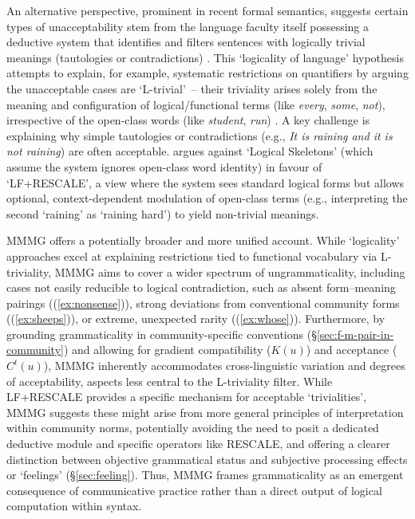 \documentclass[12pt,letterpaper]{article}
\begin{document}
An alternative perspective, prominent in recent formal semantics, suggests certain types of unacceptability stem from the language faculty itself possessing a deductive system that identifies and filters sentences with logically trivial meanings (tautologies or contradictions) \autocite[cf.][]{del_pinal_logicality_2019, chierchia_logic_2013, fox_economy_2000}. This `logicality of language' hypothesis attempts to explain, for example, systematic restrictions on quantifiers by arguing the unacceptable cases are `L-trivial'~-- their triviality arises solely from the meaning and configuration of logical/functional terms (like \textit{every}, \textit{some}, \textit{not}), irrespective of the open-class words (like \textit{student}, \textit{run}) \autocite{gajewski_l-triviality_2009}. A key challenge is explaining why simple tautologies or contradictions (e.g., \textit{It is raining and it is not raining}) are often acceptable. \textcite{del_pinal_logicality_2019} argues against `Logical Skeletons' (which assume the system ignores open-class word identity) in favour of `LF+RESCALE', a view where the system sees standard logical forms but allows optional, context-dependent modulation of open-class terms (e.g., interpreting the second `raining' as `raining hard') to yield non-trivial meanings.

MMMG offers a potentially broader and more unified account. While `logicality' approaches excel at explaining restrictions tied to functional vocabulary via L-triviality, MMMG aims to cover a wider spectrum of ungrammaticality, including cases not easily reducible to logical contradiction, such as absent form--meaning pairings ((\ref{ex:nonsense})), strong deviations from conventional community forms ((\ref{ex:sheeps})), or extreme, unexpected rarity ((\ref{ex:whose})). Furthermore, by grounding grammaticality in community-specific conventions (\S\ref{sec:f-m-pair-in-community}) and allowing for gradient compatibility ($K(u)$) and acceptance ($C^t(u)$), MMMG inherently accommodates cross-linguistic variation and degrees of acceptability, aspects less central to the L-triviality filter. While LF+RESCALE provides a specific mechanism for acceptable `trivialities', MMMG suggests these might arise from more general principles of interpretation within community norms, potentially avoiding the need to posit a dedicated deductive module and specific operators like RESCALE, and offering a clearer distinction between objective grammatical status and subjective processing effects or `feelings' (\S\ref{sec:feeling}). Thus, MMMG frames grammaticality as an emergent consequence of communicative practice rather than a direct output of logical computation within syntax.
\end{document}
